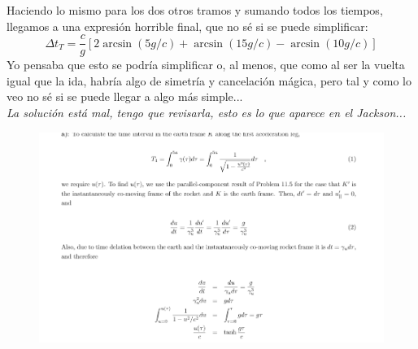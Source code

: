 Haciendo lo mismo para los dos otros tramos y sumando todos los tiempos, llegamos a una expresión horrible final, que no sé si se puede simplificar:
$$
\boxed{\Delta t_T = \frac{c}{g} \left [ 2 \arcsin(5g/c) + \arcsin(15g/c) - \arcsin(10g/c)\right ]}
$$
Yo pensaba que esto se podría simplificar o, al menos, que como al ser la vuelta igual que la ida, habría algo de simetría y cancelación mágica, pero tal y como lo veo no sé si se puede llegar a algo más simple...\\

\color{red}
\emph{La solución está mal, tengo que revisarla, esto es lo que aparece en el Jackson...}
\newpage
\begin{figure}[!t]
    \centering
    \includegraphics[scale=.7]{FOTOS/hoja 1_1.png}
    \label{fig:hoja1_1}
\end{figure}


